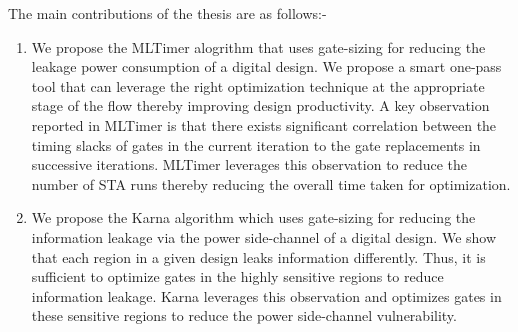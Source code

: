 The main contributions of the thesis are as follows:-
\begin{enumerate}
\item We propose the MLTimer alogrithm that uses gate-sizing for reducing the leakage power consumption of a digital design. We propose a smart one-pass tool that can leverage the right optimization technique at the appropriate stage of the flow thereby improving design productivity. A key observation reported in MLTimer is that there exists significant correlation between the timing slacks of gates in the current iteration to the gate replacements in successive iterations. MLTimer leverages this observation to reduce the number of STA runs thereby reducing the overall time taken for optimization.

\item We propose the Karna algorithm which uses gate-sizing for reducing the information leakage via the power side-channel of a digital design. We show that each region in a given design leaks information differently. Thus, it is sufficient to optimize gates in the highly sensitive regions to reduce information leakage. Karna leverages this observation and optimizes gates in these sensitive regions to reduce the power side-channel vulnerability. 

\end{enumerate}
 